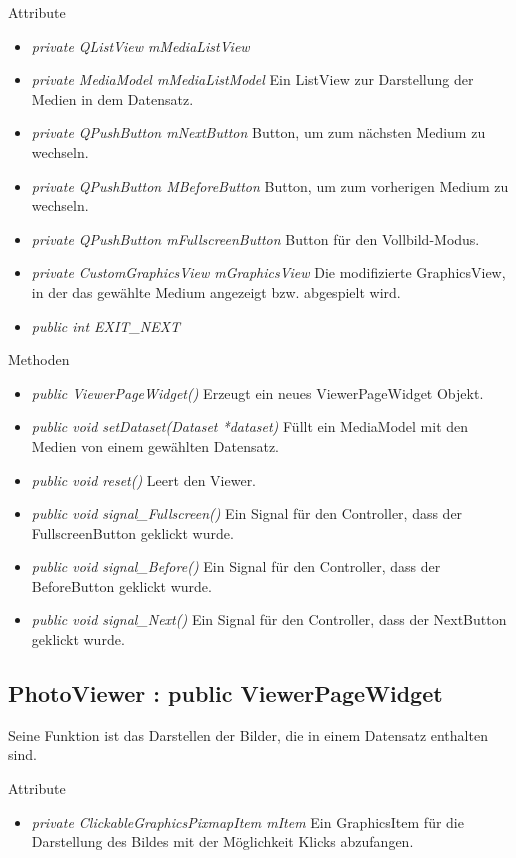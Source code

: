 Attribute
\begin{itemize}
	\item\textit{private QListView mMediaListView}
	
	\item\textit{private MediaModel mMediaListModel} Ein ListView zur Darstellung der Medien in dem Datensatz.
	\item\textit{private QPushButton mNextButton}
	Button, um zum nächsten Medium zu wechseln. 
	\item\textit{private QPushButton MBeforeButton}
	Button, um zum vorherigen Medium zu wechseln.
	\item\textit{private QPushButton mFullscreenButton}
	Button für den Vollbild-Modus.
	\item\textit{private CustomGraphicsView mGraphicsView} Die modifizierte GraphicsView, in der das gewählte Medium angezeigt bzw. abgespielt wird.  
	\item\textit{public int EXIT\_NEXT}      
\end{itemize}

Methoden
\begin{itemize}
	\item\textit{public ViewerPageWidget()} Erzeugt ein neues ViewerPageWidget Objekt.
	\item\textit{public void setDataset(Dataset *dataset)} Füllt ein MediaModel mit den Medien von einem gewählten Datensatz.
	\item\textit{public void reset()} Leert den Viewer.
	\item\textit{public void signal\_Fullscreen()} Ein Signal für den Controller, dass der FullscreenButton geklickt wurde.
	\item\textit{public void signal\_Before()} 
	Ein Signal für den Controller, dass der BeforeButton geklickt wurde.
	\item\textit{public void signal\_Next()} Ein Signal für den Controller, dass der NextButton geklickt wurde.
\end{itemize}

\subsection*{PhotoViewer : public ViewerPageWidget}
Seine Funktion ist das Darstellen der Bilder, die in einem Datensatz enthalten sind.

Attribute
\begin{itemize}
	\item\textit{private ClickableGraphicsPixmapItem mItem} Ein GraphicsItem für die Darstellung des Bildes mit der Möglichkeit Klicks abzufangen. 
	   
\end{itemize}

